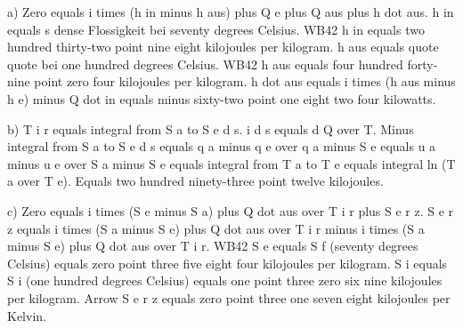a) Zero equals i times (h in minus h aus) plus Q e plus Q aus plus h dot aus. h in equals s dense Flossigkeit bei seventy degrees Celsius. WB42 h in equals two hundred thirty-two point nine eight kilojoules per kilogram. h aus equals quote quote bei one hundred degrees Celsius. WB42 h aus equals four hundred forty-nine point zero four kilojoules per kilogram. h dot aus equals i times (h aus minus h e) minus Q dot in equals minus sixty-two point one eight two four kilowatts.

b) T i r equals integral from S a to S e d s. i d s equals d Q over T. Minus integral from S a to S e d s equals q a minus q e over q a minus S e equals u a minus u e over S a minus S e equals integral from T a to T e equals integral ln (T a over T e). Equals two hundred ninety-three point twelve kilojoules.

c) Zero equals i times (S e minus S a) plus Q dot aus over T i r plus S e r z. S e r z equals i times (S a minus S e) plus Q dot aus over T i r minus i times (S a minus S e) plus Q dot aus over T i r. WB42 S e equals S f (seventy degrees Celsius) equals zero point three five eight four kilojoules per kilogram. S i equals S i (one hundred degrees Celsius) equals one point three zero six nine kilojoules per kilogram. Arrow S e r z equals zero point three one seven eight kilojoules per Kelvin.